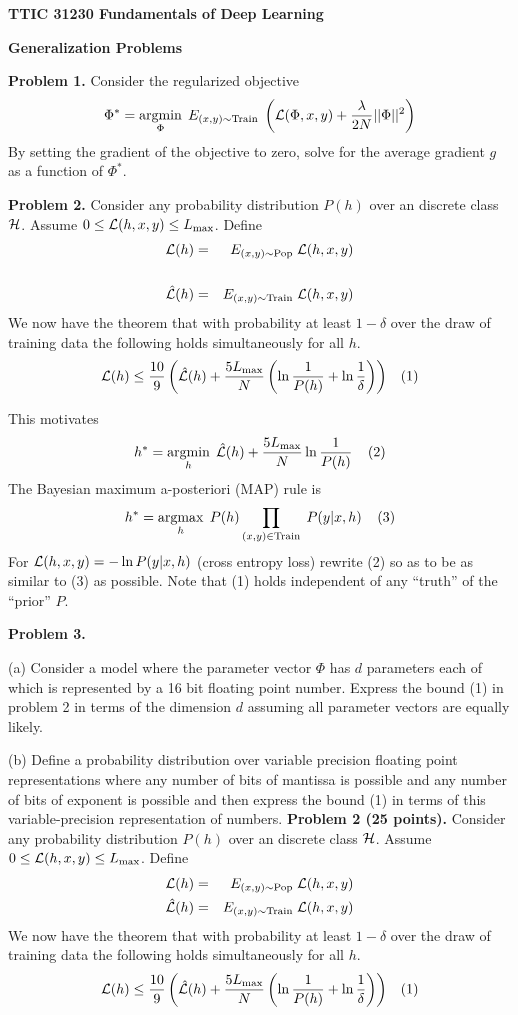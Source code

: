 \documentclass{article}
\begin{document}
\centerline{\bf TTIC 31230 Fundamentals of Deep Learning}
\bigskip
\centerline{\bf Generalization Problems}

\bigskip
\bigskip

{\bf Problem 1.} Consider the regularized objective
$$\Phi^* = \operatorname*{argmin}_\Phi \;E_{(x,y) \sim \mathrm{Train}}\;\left({\cal L}(\Phi,x,y) + \frac{\lambda}{2N}||\Phi||^2\right)$$
By setting the gradient of the objective to zero, solve for the average gradient $g$ as a function of $\Phi^*$.

\medskip
{\bf Problem 2.} Consider any probability distribution $P(h)$ over an discrete class ${\cal H}$.
Assume $0 \leq {\cal L}(h,x,y) \leq L_{\max}$. Define
\begin{eqnarray*}
{\cal L}(h)  & = &  E_{(x,y)\sim \mathrm{Pop}}\;{\cal L}(h,x,y) \\
\\
\hat{{\cal L}}(h) & = & E_{(x,y)\sim \mathrm{Train}}\;{\cal L}(h,x,y)
\end{eqnarray*}
We now have the theorem that with probability
at least $1-\delta$ over the draw of training data the following holds simultaneously for all $h$.
$${\cal L}(h) \leq \frac{10}{9}\left(\hat{\cal L}(h) + \frac{5 L_\mathrm{max}}{N}\left(\ln \frac{1}{P(h)} + \ln\frac{1}{\delta}\right)\right) \;\;\;(1)$$

This motivates
$$h^* = \operatorname*{argmin}_h \;\hat{{\cal L}}(h) + \frac{5L_{\max}}{N} \ln\frac{1}{P(h)}\;\;\;\;(2)$$
The Bayesian maximum a-posteriori (MAP) rule is
$$h^* = \operatorname*{argmax}_h\;P(h)\prod_{(x,y) \in \mathrm{Train}}\;P(y|x,h)\;\;\;\;(3)$$
For ${\cal L}(h,x,y) = - \ln P(y|x,h)$ (cross entropy loss) rewrite (2) so as to be as similar to (3) as possible.
Note that (1) holds independent of any ``truth'' of the ``prior'' $P$.

\bigskip
{\bf Problem 3.}

\medskip
(a) Consider a model where the parameter vector $\Phi$ has $d$ parameters each of which is represented by a 16 bit floating point number.
Express the bound (1) in problem 2 in terms of the dimension $d$ assuming all parameter vectors are equally likely.

\medskip
(b) Define a probability distribution over variable precision floating point representations where any number of bits of mantissa is possible and any number of bits of exponent
is possible and then express the bound (1) in terms of this variable-precision representation of numbers.
{\bf Problem 2 (25 points).} Consider any probability distribution
$P(h)$ over an discrete class ${\cal H}$.  Assume $0 \leq {\cal
  L}(h,x,y) \leq L_{\max}$. Define
\begin{eqnarray*}
{\cal L}(h) & = & E_{(x,y)\sim \mathrm{Pop}}\;{\cal L}(h,x,y)
\\ \hat{{\cal L}}(h) & = & E_{(x,y)\sim \mathrm{Train}}\;{\cal
  L}(h,x,y)
\end{eqnarray*}
We now have the theorem that with probability at least $1-\delta$ over
the draw of training data the following holds simultaneously for all
$h$.
$${\cal L}(h) \leq \frac{10}{9}\left(\hat{\cal L}(h) + \frac{5 L_\mathrm{max}}{N}\left(\ln \frac{1}{P(h)} + \ln\frac{1}{\delta}\right)\right) \;\;\;(1)$$
\end{document}
